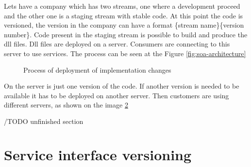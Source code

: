Lets have a company which has two streams, one where a development proceed and the other one is a staging stream with stable code. At this point the code is versioned, the version in the company can have a format \{stream name\}\{version number\}. Code present in the staging stream is possible to build and produce the dll files. Dll files are deployed on a server. Consumers are connecting to this server to use services. The process can be seen at the Figure \ref{fig:soa-architecture}

\begin{figure}[htp] 
\caption{Process of deployment of implementation changes}
\label{fig:service-implementation}
\end{figure} 

\bigskip

On the server is just one version of the code. If another version is needed to be available it has to be deployed on another server. Then customers are using different servers, as shown on the image \ref{fig:consumer-server}

/TODO unfinished section

\begin{figure}[htp] 
\caption{}
\label{fig:consumer-server}
\end{figure} 

\section{Service interface versioning}
\label{sec:interfaceversioning}

